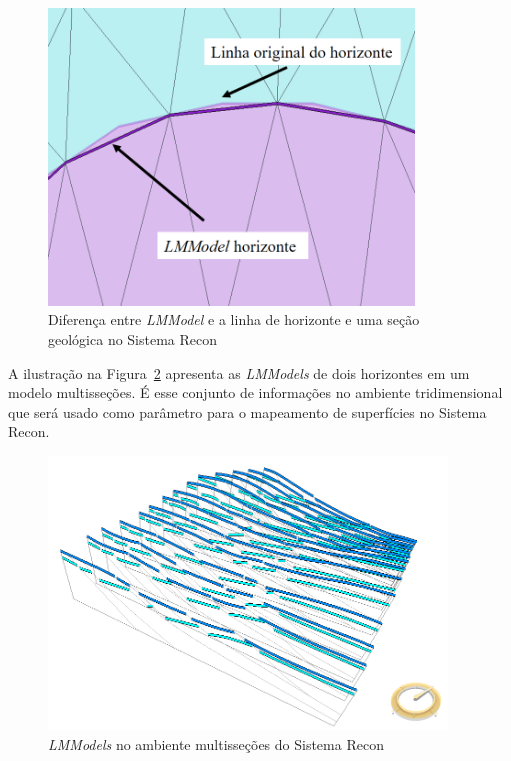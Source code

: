 \begin{figure} [h!]
  \begin{center}
    \includegraphics[width=275pt]{images/fig-lmmodel-mesh-diff}
    \caption{Diferença entre \textit{LMModel} e a linha de horizonte e uma seção geológica no Sistema Recon}\label{fig-lmmodel-mesh-diff}
  \end{center}
\end{figure}

A ilustração na Figura~\ref{fig-lmmodel-ms} apresenta as \textit{LMModels} de dois horizontes em um modelo multisseções. É esse conjunto de informações no ambiente tridimensional que será usado como parâmetro para o mapeamento de superfícies no Sistema Recon.

\begin{figure} [h!]
  \begin{center}
    \includegraphics[width=300pt]{images/fig-lmmodel-ms}
    \caption{\textit{LMModels} no ambiente multisseções do Sistema Recon}\label{fig-lmmodel-ms}
  \end{center}
\end{figure}


